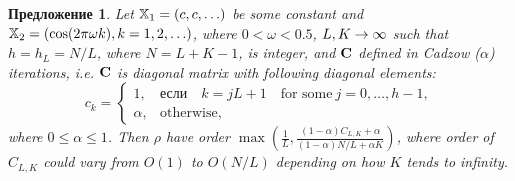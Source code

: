 \documentclass[12pt,a4paper,fleqn,leqno]{article}
\newtheorem{proposition}{Предложение}
\begin{document}
\begin{proposition}
\label{prop:separ1}
Let $\mathbb{X}_1 = (c, c, \ldots)$ be some constant and $\mathbb{X}_2 = (\cos(2 \pi \omega k), k = 1, 2, \ldots)$, where $0<\omega <0.5$, $L,K\rightarrow \infty$ such that $h = h_L = N/L$, where $N=L+K-1$, is integer, and $\mathbf{C}$ defined in Cadzow ($\alpha$) iterations, i.e.  $\mathbf{C}$ is diagonal matrix with following diagonal elements:
\begin{equation*}
c_k = \begin{cases}
1, & \text{если} \quad k = jL+1 \quad \text{for some} \ j = 0, \ldots, h-1,\\
\alpha, & \text{otherwise},
\end{cases}
\end{equation*}
where $0 \le \alpha \le 1$. Then $\rho$ have order $\max(\frac{1}{L}, \frac{(1-\alpha)C_{L,K}+\alpha}{(1-\alpha)N/L+\alpha K})$, where order of $C_{L,K}$
could vary from $O(1)$ to $O(N/L)$ depending on how $K$ tends to infinity.
\end{proposition}
\end{document}
